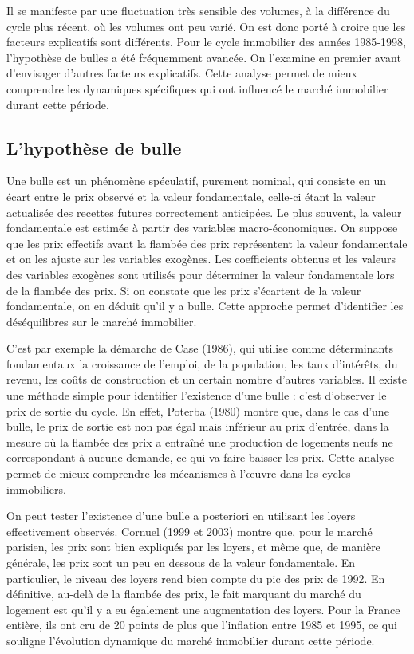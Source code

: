 \documentclass[a4paper, 12pt]{report}
\begin{document}
Il se manifeste par une fluctuation très sensible des volumes, à la différence du cycle plus récent, où les volumes ont peu varié. On est donc porté à croire que les facteurs explicatifs sont différents. Pour le cycle immobilier des années 1985-1998, l'hypothèse de bulles a été fréquemment avancée. On l'examine en premier avant d'envisager d'autres facteurs explicatifs. Cette analyse permet de mieux comprendre les dynamiques spécifiques qui ont influencé le marché immobilier durant cette période.

\subsection{L’hypothèse de bulle}

Une bulle est un phénomène spéculatif, purement nominal, qui consiste en un écart entre le prix observé et la valeur fondamentale, celle-ci étant la valeur actualisée des recettes futures correctement anticipées. Le plus souvent, la valeur fondamentale est estimée à partir des variables macro-économiques. On suppose que les prix effectifs avant la flambée des prix représentent la valeur fondamentale et on les ajuste sur les variables exogènes. Les coefficients obtenus et les valeurs des variables exogènes sont utilisés pour déterminer la valeur fondamentale lors de la flambée des prix. Si on constate que les prix s'écartent de la valeur fondamentale, on en déduit qu'il y a bulle. Cette approche permet d'identifier les déséquilibres sur le marché immobilier.

C’est par exemple la démarche de Case (1986), qui utilise comme déterminants fondamentaux la croissance de l’emploi, de la population, les taux d’intérêts, du revenu, les coûts de construction et un certain nombre d’autres variables. Il existe une méthode simple pour identifier l’existence d’une bulle : c’est d’observer le prix de sortie du cycle. En effet, Poterba (1980) montre que, dans le cas d’une bulle, le prix de sortie est non pas égal mais inférieur au prix d’entrée, dans la mesure où la flambée des prix a entraîné une production de logements neufs ne correspondant à aucune demande, ce qui va faire baisser les prix. Cette analyse permet de mieux comprendre les mécanismes à l'œuvre dans les cycles immobiliers.

On peut tester l’existence d’une bulle a posteriori en utilisant les loyers effectivement observés. Cornuel (1999 et 2003) montre que, pour le marché parisien, les prix sont bien expliqués par les loyers, et même que, de manière générale, les prix sont un peu en dessous de la valeur fondamentale. En particulier, le niveau des loyers rend bien compte du pic des prix de 1992. En définitive, au-delà de la flambée des prix, le fait marquant du marché du logement est qu’il y a eu également une augmentation des loyers. Pour la France entière, ils ont cru de 20 points de plus que l’inflation entre 1985 et 1995, ce qui souligne l’évolution dynamique du marché immobilier durant cette période.
\end{document}
